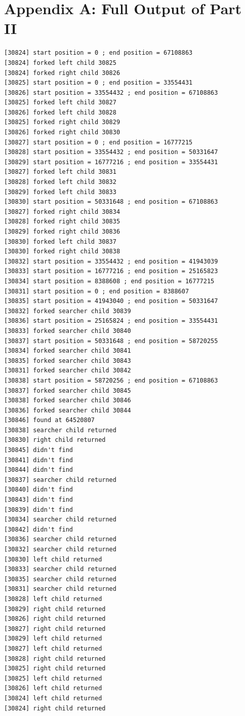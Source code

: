 \documentclass[11pt]{article}
\begin{document}
\section*{Appendix A: Full Output of Part II}
\begin{footnotesize}
\begin{verbatim}
[30824] start position = 0 ; end position = 67108863
[30824] forked left child 30825
[30824] forked right child 30826
[30825] start position = 0 ; end position = 33554431
[30826] start position = 33554432 ; end position = 67108863
[30825] forked left child 30827
[30826] forked left child 30828
[30825] forked right child 30829
[30826] forked right child 30830
[30827] start position = 0 ; end position = 16777215
[30828] start position = 33554432 ; end position = 50331647
[30829] start position = 16777216 ; end position = 33554431
[30827] forked left child 30831
[30828] forked left child 30832
[30829] forked left child 30833
[30830] start position = 50331648 ; end position = 67108863
[30827] forked right child 30834
[30828] forked right child 30835
[30829] forked right child 30836
[30830] forked left child 30837
[30830] forked right child 30838
[30832] start position = 33554432 ; end position = 41943039
[30833] start position = 16777216 ; end position = 25165823
[30834] start position = 8388608 ; end position = 16777215
[30831] start position = 0 ; end position = 8388607
[30835] start position = 41943040 ; end position = 50331647
[30832] forked searcher child 30839
[30836] start position = 25165824 ; end position = 33554431
[30833] forked searcher child 30840
[30837] start position = 50331648 ; end position = 58720255
[30834] forked searcher child 30841
[30835] forked searcher child 30843
[30831] forked searcher child 30842
[30838] start position = 58720256 ; end position = 67108863
[30837] forked searcher child 30845
[30838] forked searcher child 30846
[30836] forked searcher child 30844
[30846] found at 64520807
[30838] searcher child returned
[30830] right child returned
[30845] didn't find
[30841] didn't find
[30844] didn't find
[30837] searcher child returned
[30840] didn't find
[30843] didn't find
[30839] didn't find
[30834] searcher child returned
[30842] didn't find
[30836] searcher child returned
[30832] searcher child returned
[30830] left child returned
[30833] searcher child returned
[30835] searcher child returned
[30831] searcher child returned
[30828] left child returned
[30829] right child returned
[30826] right child returned
[30827] right child returned
[30829] left child returned
[30827] left child returned
[30828] right child returned
[30825] right child returned
[30825] left child returned
[30826] left child returned
[30824] left child returned
[30824] right child returned
\end{verbatim}
\end{footnotesize}
\end{document}
